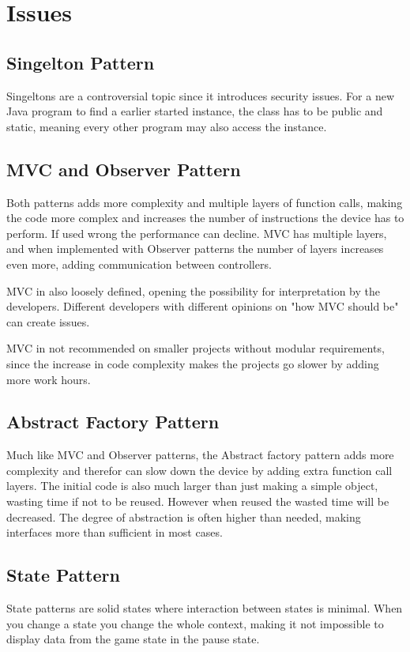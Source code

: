 \chapter{Issues}
\section{Singelton Pattern}
	Singeltons are a controversial topic since it introduces security issues. For a new Java program to find a earlier started instance, the class has to be public and static, meaning every other program may also access the instance. 

\section{MVC and Observer Pattern}
	Both patterns adds more complexity and multiple layers of function calls, making the code more complex and increases the number of instructions the device has to perform. If used wrong the performance can decline. MVC has multiple layers, and when implemented with Observer patterns the number of layers increases even more, adding communication between controllers.

	MVC in also loosely defined, opening the possibility for interpretation by the developers. Different developers with different opinions on "how MVC should be" can create issues.

	MVC in not recommended on smaller projects without modular requirements, since the increase in code complexity makes the projects go slower by adding more work hours.

\section{Abstract Factory Pattern}
	Much like MVC and Observer patterns, the Abstract factory pattern adds more complexity and therefor can slow down the device by adding extra function call layers. The initial code is also much larger than just making a simple object, wasting time if not to be reused. However when reused the wasted time will be decreased.
	The degree of abstraction is often higher than needed, making interfaces more than sufficient in most cases.

\section{State Pattern}
	State patterns are solid states where interaction between states is minimal. When you change a state you change the whole context, making it not impossible to display data from the game state in the pause state.